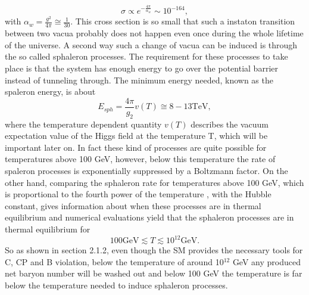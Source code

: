 \begin{equation}
	\sigma\propto e^{-\frac{4\pi}{\alpha_w}}\sim10^{-164},
	\label{eq:instaton_cross_section}
\end{equation}
with $\alpha_w=\frac{g^2}{4\pi}\cong\frac{1}{30}$.
This cross section is so small that such a instaton transition between two vacua probably does not happen even once during the whole lifetime of the universe. \newline\indent
A second way such a change of vacua can be induced is through the so called sphaleron processes. The requirement for these processes to take place is that the system has enough energy to go over the potential barrier instead of tunneling through. The minimum energy needed, known as the spaleron energy, is about\cite{Cline:2006ts,Bernreuther:2002uj}
\begin{equation}
	E_{sph}=\frac{4\pi}{g_2}v(T)\cong8-13\text{TeV},
	\label{eq:spaleron}
\end{equation} 
where the temperature dependent quantity $v(T)$ describes the vacuum expectation value of the Higgs field at the temperature T, which will be important later on.\newline\indent
In fact these kind of processes are quite possible for temperatures above 100 GeV, however, below this temperature the rate of spaleron processes is exponentially suppressed by a Boltzmann factor. On the other hand, comparing the sphaleron rate for temperatures above 100 GeV, which is proportional to the fourth power of the temperature \cite[p. 19]{Bernreuther:2002uj}, with the Hubble constant, gives information about when these processes are in thermal equilibrium and numerical evaluations yield that the sphaleron processes are in thermal equilibrium for
\begin{equation*}
100\text{GeV}\lesssim T \lesssim 10^{12}\text{GeV}.
\end{equation*}
So as shown in section 2.1.2, even though the SM provides the necessary tools for C, CP and B violation, below the temperature of around 10$^{12}$ GeV any produced net baryon number will be washed out and below 100 GeV the temperature is far below the temperature needed to induce sphaleron processes. \newline\indent
